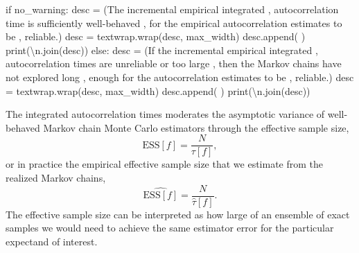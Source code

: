 \documentclass[
  letterpaper,
  DIV=11,
  numbers=noendperiod]{scrartcl}
\newenvironment{Shaded}{\begin{snugshade}}{\end{snugshade}}
\newcommand{\BuiltInTok}[1]{\textcolor[rgb]{0.00,0.23,0.31}{#1}}
\newcommand{\CharTok}[1]{\textcolor[rgb]{0.13,0.47,0.30}{#1}}
\newcommand{\ControlFlowTok}[1]{\textcolor[rgb]{0.00,0.23,0.31}{#1}}
\newcommand{\NormalTok}[1]{\textcolor[rgb]{0.00,0.23,0.31}{#1}}
\newcommand{\OperatorTok}[1]{\textcolor[rgb]{0.37,0.37,0.37}{#1}}
\newcommand{\StringTok}[1]{\textcolor[rgb]{0.13,0.47,0.30}{#1}}
\begin{document}
\begin{Shaded}
\begin{Highlighting}[]
  \ControlFlowTok{if}\NormalTok{ no\_warning:}
\NormalTok{    desc }\OperatorTok{=}\NormalTok{ (}\StringTok{\textquotesingle{}The incremental empirical integrated \textquotesingle{}}\NormalTok{,}
            \StringTok{\textquotesingle{}autocorrelation time is sufficiently well{-}behaved \textquotesingle{}}\NormalTok{,}
            \StringTok{\textquotesingle{}for the empirical autocorrelation estimates to be \textquotesingle{}}\NormalTok{,}
            \StringTok{\textquotesingle{}reliable.\textquotesingle{}}\NormalTok{)}
\NormalTok{    desc }\OperatorTok{=}\NormalTok{ textwrap.wrap(desc, max\_width)}
\NormalTok{    desc.append(}\StringTok{\textquotesingle{} \textquotesingle{}}\NormalTok{)}
    \BuiltInTok{print}\NormalTok{(}\StringTok{\textquotesingle{}}\CharTok{\textbackslash{}n}\StringTok{\textquotesingle{}}\NormalTok{.join(desc))}
  \ControlFlowTok{else}\NormalTok{:}
\NormalTok{    desc }\OperatorTok{=}\NormalTok{ (}\StringTok{\textquotesingle{}If the incremental empirical integrated \textquotesingle{}}\NormalTok{,}
            \StringTok{\textquotesingle{}autocorrelation times are unreliable or too large \textquotesingle{}}\NormalTok{,}
            \StringTok{\textquotesingle{}then the Markov chains have not explored long \textquotesingle{}}\NormalTok{,}
            \StringTok{\textquotesingle{}enough for the autocorrelation estimates to be \textquotesingle{}}\NormalTok{,}
            \StringTok{\textquotesingle{}reliable.\textquotesingle{}}\NormalTok{)}
\NormalTok{    desc }\OperatorTok{=}\NormalTok{ textwrap.wrap(desc, max\_width)}
\NormalTok{    desc.append(}\StringTok{\textquotesingle{} \textquotesingle{}}\NormalTok{)}
    \BuiltInTok{print}\NormalTok{(}\StringTok{\textquotesingle{}}\CharTok{\textbackslash{}n}\StringTok{\textquotesingle{}}\NormalTok{.join(desc))}
\end{Highlighting}
\end{Shaded}

The integrated autocorrelation times moderates the asymptotic variance
of well-behaved Markov chain Monte Carlo estimators through the
effective sample size, \[
\text{ESS}[f] = \frac{N}{\tau[f]},
\] or in practice the empirical effective sample size that we estimate
from the realized Markov chains, \[
\hat{\text{ESS}[f]} = \frac{N}{\hat{\tau}[f]}.
\] The effective sample size can be interpreted as how large of an
ensemble of exact samples we would need to achieve the same estimator
error for the particular expectand of interest.
\end{document}
